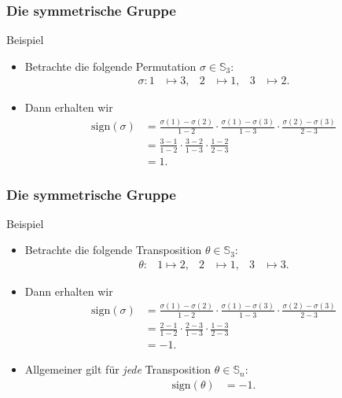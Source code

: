 \documentclass{beamer}
\renewcommand{\emph}[1]{{\textcolor{solarizedRed}{\itshape #1}}}
\renewcommand\SS{\mathbb S}
\newcommand\sign{\mathrm{sign}}
\newcommand{\ue}{\"u}
\begin{document}
\begin{frame}\frametitle{Die symmetrische Gruppe}
	\begin{block}{Beispiel}
		\begin{itemize}
			\item Betrachte die folgende Permutation $\sigma\in\SS_3$:
				\begin{align*}
					\sigma:1&\mapsto 3,&2&\mapsto 1,&3&\mapsto 2.
				\end{align*}
			\item Dann erhalten wir
				\begin{align*}
					\sign(\sigma)&=\frac{\sigma(1)-\sigma(2)}{1-2}\cdot\frac{\sigma(1)-\sigma(3)}{1-3}\cdot\frac{\sigma(2)-\sigma(3)}{2-3}\\
								 &=\frac{3-1}{1-2}\cdot\frac{3-2}{1-3}\cdot\frac{1-2}{2-3}\\&=1.
				\end{align*}
		\end{itemize}
	\end{block}
\end{frame}

\begin{frame}\frametitle{Die symmetrische Gruppe}
	\begin{block}{Beispiel}
		\begin{itemize}
			\item Betrachte die folgende Transposition $\theta\in\SS_3$:
				\begin{align*}
					\theta:&1\mapsto 2,&2&\mapsto 1,&3&\mapsto 3.
				\end{align*}
			\item Dann erhalten wir
				\begin{align*}
					\sign(\sigma)&=\frac{\sigma(1)-\sigma(2)}{1-2}\cdot\frac{\sigma(1)-\sigma(3)}{1-3}\cdot\frac{\sigma(2)-\sigma(3)}{2-3}\\
								 &=\frac{2-1}{1-2}\cdot\frac{2-3}{1-3}\cdot\frac{1-3}{2-3}\\&=-1.
				\end{align*}
			\item Allgemeiner gilt f\ue r \emph{jede} Transposition $\theta\in\SS_n$:
				\begin{align*}
					\sign(\theta)&=-1.
				\end{align*}
		\end{itemize}
	\end{block}
\end{frame}
\end{document}
